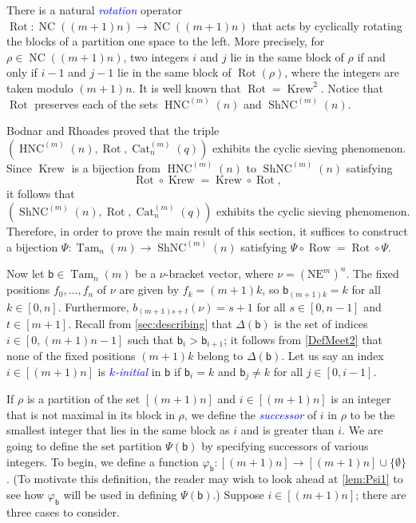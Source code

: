 \documentclass[11pt]{amsart}
\theoremstyle{definition}
\DeclareMathOperator{\NC}{NC}
\DeclareMathOperator{\ShNC}{ShNC}
\DeclareMathOperator{\HNC}{HNC}
\DeclareMathOperator{\Krew}{Krew}
\DeclareMathOperator{\Tam}{Tam}
\DeclareMathOperator{\row}{Row}
\DeclareMathOperator{\Rot}{Rot}
\DeclareMathOperator{\Cat}{Cat}
\newcommand{\dfn}[1]{\textcolor{blue}{\emph{#1}}}
\begin{document}
There is a natural \dfn{rotation} operator $\Rot\colon\NC((m+1)n)\to\NC((m+1)n)$ that acts by cyclically rotating the blocks of a partition one space to the left. More precisely, for $\rho\in\NC((m+1)n)$, two integers $i$ and $j$ lie in the same block of $\rho$ if and only if $i-1$ and $j-1$ lie in the same block of $\Rot(\rho)$, where the integers are taken modulo $(m+1)n$. It is well known that $\Rot=\Krew^2$. Notice that $\Rot$ preserves each of the sets $\HNC^{(m)}(n)$ and $\ShNC^{(m)}(n)$. 

Bodnar and Rhoades \cite{BodnarRhoades} proved that the triple $(\HNC^{(m)}(n),\Rot,\Cat_n^{(m)}(q))$ exhibits the cyclic sieving phenomenon. Since $\Krew$ is a bijection from $\HNC^{(m)}(n)$ to $\ShNC^{(m)}(n)$ satisfying \[\Rot\circ\Krew=\Krew\circ\Rot,\] it follows that \begin{equation}\label{Eq9}
(\ShNC^{(m)}(n),\Rot,\Cat_n^{(m)}(q))\text{ exhibits the cyclic sieving phenomenon.}
\end{equation}
Therefore, in order to prove the main result of this section, it suffices to construct a bijection $\Psi\colon\Tam_n(m)\to\ShNC^{(m)}(n)$ satisfying $\Psi\circ\row=\Rot\circ\Psi$. 


Now let $\mathsf b\in\Tam_n(m)$ be a $\nu$-bracket vector, where
$\nu=(\text{N}\text{E}^m)^n$. The fixed positions $f_0,\ldots,f_n$ of $\nu$ are given by $f_k=(m+1)k$, so $\mathsf b_{(m+1)k}=k$ for all $k\in[0,n]$. Furthermore, $b_{(m+1)s+t}(\nu)=s+1$ for all $s\in[0,n-1]$ and $t\in[m+1]$. Recall from \cref{sec:describing} that $\Delta(\mathsf b)$ is the set of indices $i\in[0,(m+1)n-1]$ such that $\mathsf b_i>\mathsf b_{i+1}$; it follows from \cref{DefMeet2} that none of the fixed positions $(m+1)k$ belong to $\Delta(\mathsf b)$. Let us say an index $i\in[(m+1)n]$ is \dfn{$k$-initial} in $\mathsf b$ if $\mathsf b_i=k$ and $\mathsf b_{j}\neq k$ for all $j\in[0,i-1]$. 

If $\rho$ is a partition of the set $[(m+1)n]$ and $i\in[(m+1)n]$ is an integer that is not maximal in its block in $\rho$, we define the \dfn{successor} of $i$ in $\rho$ to be the smallest integer that lies in the same block as $i$ and is greater than $i$. We are going to define the set partition $\Psi(\mathsf b)$ by specifying successors of various integers. To begin, we define a function $\varphi_{\mathsf b}\colon[(m+1)n]\to[(m+1)n]\cup\{\emptyset\}$. (To motivate this definition, the reader may wish to look ahead at \cref{lem:Psi1} to see how $\varphi_{\mathsf{b}}$ will be used in defining $\Psi(\mathsf b)$.) Suppose $i\in[(m+1)n]$; there are three cases to consider. 
\end{document}
